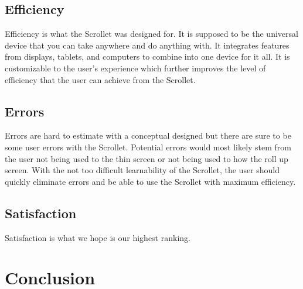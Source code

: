 \documentclass[a4paper]{article}
\begin{document}
\subsection{Efficiency}
Efficiency is what the Scrollet was designed for. It is supposed to be the universal device that you can take anywhere and do anything with. It integrates features from displays, tablets, and computers to combine into one device for it all. It is customizable to the user's experience which further improves the level of efficiency that the user can achieve from the Scrollet.
\subsection{Errors}
Errors are hard to estimate with a conceptual designed but there are sure to be some user errors with the Scrollet. Potential errors would most likely stem from the user not being used to the thin screen or not being used to how the roll up screen. With the not too difficult learnability of the Scrollet, the user should quickly eliminate errors and be able to use the Scrollet with maximum efficiency.
\subsection{Satisfaction}
Satisfaction is what we hope is our highest ranking.

\section{Conclusion}




\end{document}
